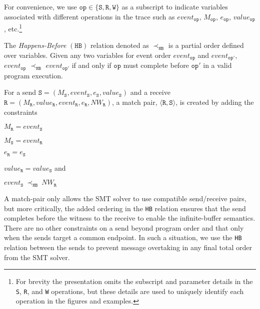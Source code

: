 For convenience, we use $\mathtt{op} \in \{\mathtt{S}, \mathtt{R},
\mathtt{W}\}$ as a subscript to indicate variables associated with different
operations in the trace such as $\mathit{event}_\mathtt{op}$, $M_{\mathtt{op}}$, $e_{\mathtt{op}}$, $value_{\mathtt{op}}$, etc.\footnote{For brevity the presentation omits the subscript and parameter details in the \texttt{S}, \texttt{R}, and \texttt{W} operations, but these details are used to uniquely identify each operation in the figures and examples.} 
\begin{definition}
The \emph{Happens-Before} $(\mathtt{HB})$ relation denoted as $\mathrm{\prec_\mathtt{HB}}$ is a partial order defined over variables. Given any two variables for event order $event_{\mathtt{op}}$ and $event_{\mathtt{op'}}$, $event_{\mathtt{op}}$ $\mathrm{\prec_{\mathtt{HB}}}$ $event_{\mathtt{op'}}$ if and only if $\mathtt{op}$ must complete before $\mathtt{op'}$ in a valid program execution.
\label{def:hb}
\end{definition}
\begin{definition}
For a send $\mathtt{S}=(M_\mathtt{S},\mathit{event}_\mathtt{S}, e_\mathtt{S},\mathit{value}_\mathtt{S})$ and a receive $\mathtt{R}=(M_\mathtt{R},\mathit{value}_\mathtt{R}, \mathit{event}_\mathtt{R}, e_\mathtt{R},\mathit{NW}_\mathtt{R})$, a match pair, $\langle\mathtt{R}, \mathtt{S}\rangle$, is created by adding the constraints
\begin{compactenum}
\item $M_{\mathtt{R}} = event_{\mathtt{S}}$
\item $M_{\mathtt{S}} = event_{\mathtt{R}}$ 
\item $e_{\mathtt{R}} = e_{\mathtt{S}}$
\item $value_{\mathtt{R}} = value_{\mathtt{S}}$ and 
\item $event_{\mathtt{S}}\ \mathrm{\prec_\mathtt{HB}}\ NW_{\mathtt{R}}$
\end{compactenum}
\label{def:match}
\end{definition}
A match-pair only allows the SMT solver to use compatible send/receive
pairs, but more critically, the added ordering in the \texttt{HB}
relation ensures that the send completes before the witness to the
receive to enable the infinite-buffer semantics. There are no other
constraints on a send beyond program order and that only when the
sends target a common endpoint. In such a situation, we use the
\texttt{HB} relation between the sends to prevent message overtaking in
any final total order from the SMT solver.

